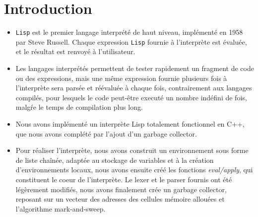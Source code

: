 \section*{Introduction}

\begin{itemize}
\item \texttt{Lisp} est le premier langage interprété de haut niveau, implémenté en 1958 par Steve Russell. Chaque expression \texttt{Lisp} fournie à l'interprète est évaluée, et le résultat est renvoyé à l'utilisateur.
\item Les langages interprétés permettent de tester rapidement un fragment de code ou des expressions, mais une même expression fournie plusieurs fois à l'interprète sera parsée et réévaluée à chaque fois, contrairement aux langages compilés, pour lesquels le code peut-être executé un nombre indéfini de fois, malgŕe le temps de compilation plus long.
\item Nous avons implémenté un interprète Lisp totalement fonctionnel en C++, que nous avons complété par l'ajout d'un garbage collector.
\item Pour réaliser l'interprète, nous avons construit un environnement sous forme de liste chaînée, adaptée au stockage de variables et à la création d'environnements locaux, nous avons ensuite créé les fonctions \emph{eval/apply}, qui constituent le coeur de l'interprète. Le lexer et le parser fournis ont été légèrement modifiés, nous avons finalement crée un garbage collector, reposant sur un vecteur des adresses des cellules mémoire allouées et l'algorithme mark-and-sweep.
\end{itemize}
